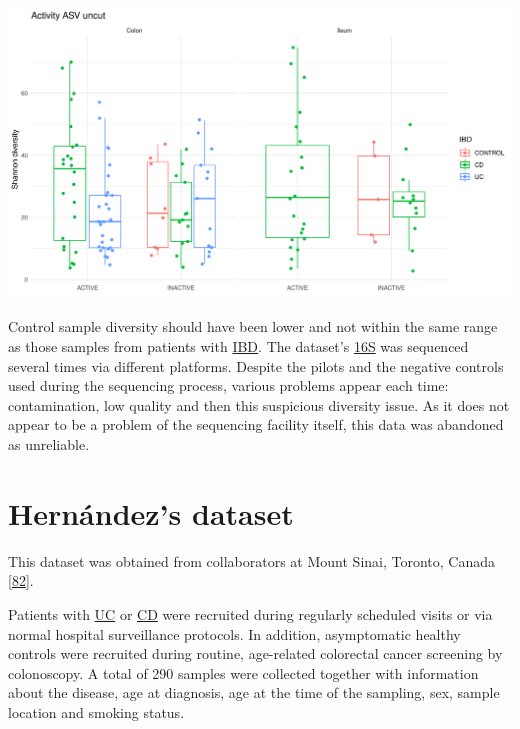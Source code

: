 \documentclass[
  12pt,
  a4paper,
  twoside,
  openright]{book}
\let\origfigure\figure
\let\endorigfigure\endfigure
\renewenvironment{figure}[1][2] {
    \expandafter\origfigure\expandafter[!htbp]
} {
    \endorigfigure
}
\begin{document}
\begin{figure}
\includegraphics[width=1\linewidth]{images/barcelona-diversity} \caption[Diversity indices of the BARCELONA cohort according based on the location and disease status.]{Diversity indices of the BARCELONA cohort based on the location and disease status. There was considerable diversity among the different groups; however, importantly, the control samples overlapped with those patients presenting inflammatory bowel disease.}\label{fig:barcelona-diversity}
\end{figure}

Control sample diversity should have been lower and not within the same range as those samples from patients with \protect\hyperlink{acronyms_IBD}{IBD}.
The dataset's \protect\hyperlink{acronyms_16S}{16S} was sequenced several times via different platforms.
Despite the pilots and the negative controls used during the sequencing process, various problems appear each time: contamination, low quality and then this suspicious diversity issue.
As it does not appear to be a problem of the sequencing facility itself, this data was abandoned as unreliable.

\hypertarget{hernandez}{%
\section{Hernández's dataset}\label{hernandez}}

This dataset was obtained from collaborators at Mount Sinai, Toronto, Canada {[}\protect\hyperlink{ref-hernuxe1ndez-rocha2021}{82}{]}.

Patients with \protect\hyperlink{acronyms_UC}{UC} or \protect\hyperlink{acronyms_CD}{CD} were recruited during regularly scheduled visits or via normal hospital surveillance protocols.
In addition, asymptomatic healthy controls were recruited during routine, age-related colorectal cancer screening by colonoscopy.
A total of 290 samples were collected together with information about the disease, age at diagnosis, age at the time of the sampling, sex, sample location and smoking status.
\end{document}
